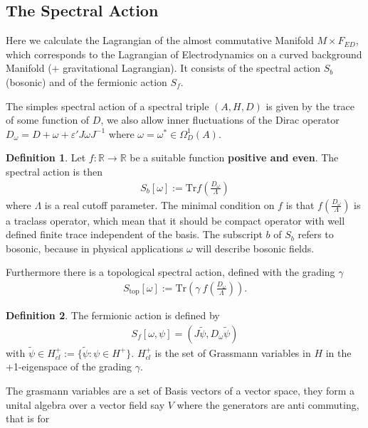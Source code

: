 \documentclass[a4paper]{article}
\theoremstyle{definition}
\newtheorem{definition}{Definition}
\theoremstyle{definition}
\theoremstyle{definition}
\theoremstyle{theorem}
\theoremstyle{theorem}
\theoremstyle{theorem}
\begin{document}
\subsection{The Spectral Action}
Here we calculate the Lagrangian of the almost commutative Manifold $M\times
F_{ED}$, which corresponds to the Lagrangian of Electrodynamics on a curved
background Manifold (+ gravitational Lagrangian). It consists of the spectral
action $S_b$ (bosonic) and of the fermionic action $S_f$.

The simples spectral action of a spectral triple $(A, H, D)$ is given by the
trace of some function of $D$, we also allow inner fluctuations of the Dirac
operator $D_\omega = D + \omega + \varepsilon' J\omega J^{-1}$ where $\omega =
\omega ^* \in \Omega_D^1(A)$.
\begin{definition}
    Let $f:\mathbb{R} \rightarrow \mathbb{R}$ be a suitable function
    \textbf{positive and even}. The spectral action is then
    \begin{align}
        S_b [\omega] := \text{Tr}f(\frac{D_\omega}{\Lambda})
    \end{align}
    where $\Lambda$ is a real cutoff parameter. The minimal condition on $f$
    is that $f(\frac{D_\omega}{\Lambda})$ is  a traclass operator, which mean
    that it should be compact operator with well defined finite trace
    independent of the basis. The subscript $b$ of $S_b$ refers to bosonic,
    because in physical applications $\omega$ will describe bosonic fields.

    Furthermore there is a topological spectral action, defined with the
    grading $\gamma$
    \begin{align}
        S_{\text{top}}[\omega] := \text{Tr}(\gamma\
        f(\frac{D_\omega}{\Lambda})).
    \end{align}
\end{definition}
\begin{definition}
    The fermionic action is defined by
    \begin{align}
        S_f[\omega, \psi] = (J\tilde{\psi}, D_\omega \tilde{\psi})
    \end{align}
    with $\tilde{\psi} \in H_{cl}^+ := \{\tilde{\psi}: \psi \in H^+\}$.
    $H_{cl}^+$ is the set of Grassmann variables in $H$ in the +1-eigenspace
    of the grading $\gamma$.
\end{definition}
The grasmann variables are a set of Basis vectors of a vector space, they
form a unital algebra over a vector field say $V$ where the generators are anti commuting, that is for
\end{document}
